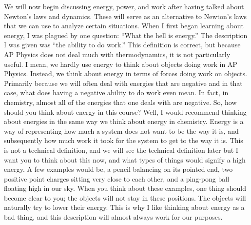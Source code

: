 \newline

We will now begin discussing energy, power, and work after having talked about Newton’s laws and dynamics. These will serve as an alternative to Newton’s laws that we can use to analyze certain situations. When I first began learning about energy, I was plagued by one question: “What the hell is energy.” The description I was given was “the ability to do work.” This definition is correct, but because AP Physics does not deal much with thermodynamics, it is not particularly useful.  I mean, we hardly use energy to think about objects doing work in AP Physics. Instead, we think about energy in terms of forces doing work on objects. Primarily because we will often deal with energies that are negative and in that case, what does having a negative ability to do work even mean. In fact, in chemistry, almost all of the energies that one deals with are negative. So, how should you think about energy in this course? Well, I would recommend thinking about energies in the same way we think about energy in chemistry. Energy is a way of representing how much a system does not want to be the way it is, and subsequently how much work it took for the system to get to the way it is. This is not a technical definition, and we will see the technical definition later but I want you to think about this now, and what types of things would signify a high energy. A few examples would be, a pencil balancing on its pointed end, two positive point charges sitting very close to each other, and a ping-pong ball floating high in our sky. When you think about these examples, one thing should become clear to you; the objects will not stay in these positions. The objects will naturally try to lower their energy. This is why I like thinking about energy as a bad thing, and this description will almost always work for our purposes.  